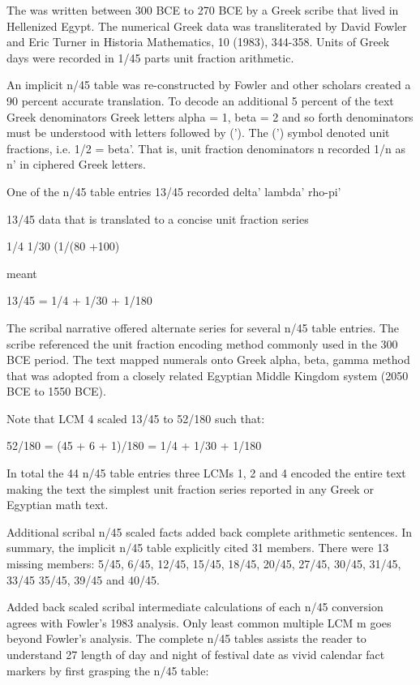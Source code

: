 \documentclass[12pt]{article}
\begin{document}
The  was written between 300 BCE to 270 BCE by a Greek scribe that lived in Hellenized Egypt. The numerical Greek data was transliterated by David Fowler and Eric Turner in Historia Mathematics, 10 (1983), 344-358. Units of Greek days were recorded in 1/45 parts unit fraction arithmetic. 

An implicit n/45 table was re-constructed by Fowler and other scholars created a 90 percent accurate translation. To decode an additional 5 percent of the text Greek denominators Greek letters  alpha = 1, beta = 2 and so forth denominators must be understood with letters followed by ('). The (') symbol denoted unit fractions, i.e. 1/2 = beta'. That is, unit fraction denominators n recorded 1/n as n' in ciphered Greek letters. 

One of the n/45 table entries 13/45 recorded delta' lambda' rho-pi'

13/45 data that is translated to a concise unit fraction series 

1/4 1/30 (1/(80 +100) 

meant

13/45 = 1/4 + 1/30 + 1/180

The scribal narrative offered alternate series for several n/45 table entries. The scribe  referenced the unit fraction encoding method commonly used in the 300 BCE period. The text mapped numerals onto Greek alpha, beta, gamma method that was adopted from a closely related Egyptian Middle Kingdom system (2050 BCE to 1550 BCE).

Note that  LCM 4 scaled 13/45 to 52/180 such that: 

52/180 = (45 + 6 + 1)/180 = 1/4 + 1/30 + 1/180

In total the 44 n/45 table entries three LCMs 1, 2 and 4 encoded the entire text making the text the simplest unit fraction series reported in any Greek or Egyptian math text.

Additional scribal n/45 scaled facts added back complete arithmetic sentences. In summary, the implicit n/45 table explicitly cited 31 members. There were 13 missing members: 5/45, 6/45, 12/45, 15/45, 18/45, 20/45, 27/45, 30/45, 31/45, 33/45 35/45, 39/45 and 40/45. 

Added back scaled scribal intermediate calculations of each n/45 conversion agrees with Fowler's 1983 analysis. Only least common multiple LCM m goes beyond Fowler's analysis. The complete n/45 tables assists the reader to understand 27 length of day and night of festival date as vivid calendar fact markers by first grasping the n/45 table:
\end{document}
